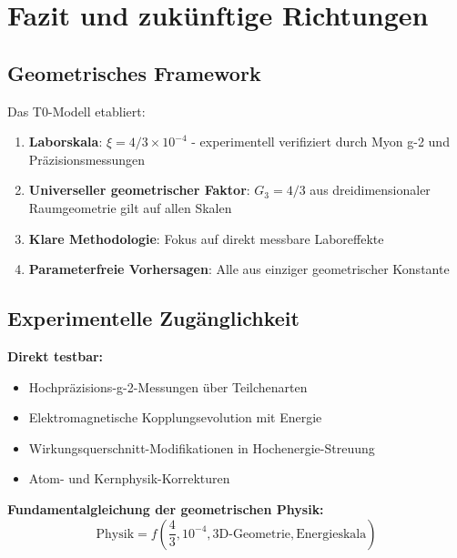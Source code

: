 \documentclass[12pt,a4paper]{report}
\begin{document}
	\section{Fazit und zukünftige Richtungen}
	\label{sec:conclusions_geometric}
	
	\subsection{Geometrisches Framework}
	\label{subsec:geometric_framework}
	
	Das T0-Modell etabliert:
	
	\begin{enumerate}
		\item \textbf{Laborskala}: $\xi = 4/3 \times 10^{-4}$ - experimentell verifiziert durch Myon g-2 und Präzisionsmessungen
		
		\item \textbf{Universeller geometrischer Faktor}: $G_3 = 4/3$ aus dreidimensionaler Raumgeometrie gilt auf allen Skalen
		
		\item \textbf{Klare Methodologie}: Fokus auf direkt messbare Laboreffekte
		
		\item \textbf{Parameterfreie Vorhersagen}: Alle aus einziger geometrischer Konstante
	\end{enumerate}
	
	\subsection{Experimentelle Zugänglichkeit}
	\label{subsec:experimental_accessibility}
	
	\textbf{Direkt testbar:}
	\begin{itemize}
		\item Hochpräzisions-g-2-Messungen über Teilchenarten
		\item Elektromagnetische Kopplungsevolution mit Energie
		\item Wirkungsquerschnitt-Modifikationen in Hochenergie-Streuung
		\item Atom- und Kernphysik-Korrekturen
	\end{itemize}
	
	\textbf{Fundamentalgleichung der geometrischen Physik:}
	\begin{equation}
		\boxed{\text{Physik} = f\left(\frac{4}{3}, 10^{-4}, \text{3D-Geometrie}, \text{Energieskala}\right)}
	\end{equation}
	
\end{document}
